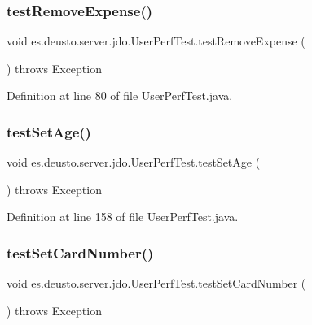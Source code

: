 \subsubsection{\texorpdfstring{test\+Remove\+Expense()}{testRemoveExpense()}}
{\footnotesize\ttfamily void es.\+deusto.\+server.\+jdo.\+User\+Perf\+Test.\+test\+Remove\+Expense (\begin{DoxyParamCaption}{ }\end{DoxyParamCaption}) throws Exception}



Definition at line 80 of file User\+Perf\+Test.\+java.

\mbox{\label{classes_1_1deusto_1_1server_1_1jdo_1_1_user_perf_test_a273b38521e147fc8d00a6d4d40e29028}} 
\subsubsection{\texorpdfstring{test\+Set\+Age()}{testSetAge()}}
{\footnotesize\ttfamily void es.\+deusto.\+server.\+jdo.\+User\+Perf\+Test.\+test\+Set\+Age (\begin{DoxyParamCaption}{ }\end{DoxyParamCaption}) throws Exception}



Definition at line 158 of file User\+Perf\+Test.\+java.

\mbox{\label{classes_1_1deusto_1_1server_1_1jdo_1_1_user_perf_test_a876ee3155a7522f155fd97e8850f1e85}} 
\subsubsection{\texorpdfstring{test\+Set\+Card\+Number()}{testSetCardNumber()}}
{\footnotesize\ttfamily void es.\+deusto.\+server.\+jdo.\+User\+Perf\+Test.\+test\+Set\+Card\+Number (\begin{DoxyParamCaption}{ }\end{DoxyParamCaption}) throws Exception}



